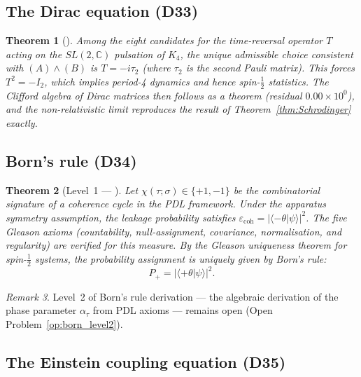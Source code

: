 \documentclass[11pt,a4paper]{article}
\theoremstyle{plain}
\newtheorem{theorem}{Theorem}[section]
\theoremstyle{definition}
\theoremstyle{remark}
\newtheorem{remark}[theorem]{Remark}
\newcommand{\Kfour}{K_4}
\begin{document}
\subsection{The Dirac equation (D33)}
\label{subsec:dirac}

\begin{theorem}[\citep{D33}]
\label{thm:Dirac}
Among the eight candidates for the time-reversal operator $T$ acting on the $SL(2,\mathbb{C})$ pulsation of $\Kfour$, the unique admissible choice consistent with $(A)\wedge(B)$ is $T=-i\tau_2$ (where $\tau_2$ is the second Pauli matrix).
This forces $T^2=-I_2$, which implies period-4 dynamics and hence spin-$\tfrac{1}{2}$ statistics.
The Clifford algebra of Dirac matrices then follows as a theorem (residual $0.00\times10^0$), and the non-relativistic limit reproduces the result of Theorem~\ref{thm:Schrodinger} exactly.
\end{theorem}

\subsection{Born's rule (D34)}
\label{subsec:born}

\begin{theorem}[Level~1 — \citep{D34}]
\label{thm:Born}
Let $\chi(\tau;\sigma)\in\{+1,-1\}$ be the combinatorial signature of a coherence cycle in the PDL framework.
Under the apparatus symmetry assumption, the leakage probability satisfies $\varepsilon_{\mathrm{coh}}=|\langle{-\theta}|\psi\rangle|^2$.
The five Gleason axioms (countability, null-assignment, covariance, normalisation, and regularity) are verified for this measure.
By the Gleason uniqueness theorem for spin-$\tfrac{1}{2}$ systems, the probability assignment is uniquely given by Born's rule:
\[
P_+ = |\langle{+\theta}|\psi\rangle|^2.
\]
\end{theorem}

\begin{remark}
Level~2 of Born's rule derivation — the algebraic derivation of the phase parameter $\alpha_\tau$ from PDL axioms — remains open (Open Problem~\ref{op:born_level2}).
\end{remark}

\subsection{The Einstein coupling equation (D35)}
\label{subsec:einstein}
\end{document}
